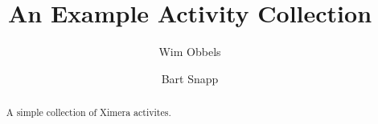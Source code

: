 \documentclass{xourse}
\author{Wim Obbels \and Bart Snapp}
\title{An Example Activity Collection}
\begin{document}
\begin{abstract}
    A simple collection of Ximera activites.
\end{abstract}
\maketitle

\end{document}
